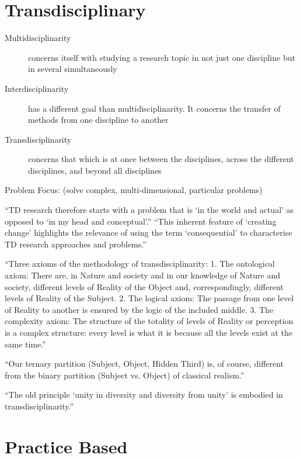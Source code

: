 \section{Transdisciplinary}


\begin{description}
  \item [Multidisciplinarity]	concerns itself with studying a research topic in not just one discipline but in several simultaneously
  \item [Interdisciplinarity]	has a different goal than multidisciplinarity. It concerns the transfer of methods from one discipline to another
  \item [Transdisciplinarity]	concerns that which is at once between the disciplines, across the different disciplines, and beyond all disciplines
\end{description} \autocite{Nicolescu2010}

Problem Focus: (solve complex, multi-dimensional, particular problems)

``TD research therefore starts with a problem that is `in the world and actual' as opposed to `in my head and conceptual'.'' ``This inherent feature of `creating change' highlights the relevance of using the term `consequential' to characterise TD research approaches and problems.'' \autocite{Wickson2006}

``Three axioms of the methodology of transdisciplinarity:
1. The ontological axiom: There are, in Nature and society and in our knowledge of Nature and society, different levels of Reality of the Object and, correspondingly, different levels of Reality of the Subject.
2. The logical axiom: The passage from one level of Reality to another is ensured by the logic of the included middle.
3. The complexity axiom: The structure of the totality of levels of Reality or perception is a complex structure: every level is what it is because all the levels exist at the same time.'' \autocite{Nicolescu2010}

``Our ternary partition (Subject, Object, Hidden Third) is, of course, different from the binary partition (Subject vs. Object) of classical realism.'' \autocite{Nicolescu2010}

``The old principle `unity in diversity and diversity from unity' is embodied in transdisciplinarity.'' \autocite{Nicolescu2010}


\section{Practice Based}

